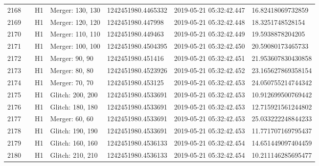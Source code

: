 \begin{longtable}{lllllll}
2168 &                                                    &       H1 &  Merger: 130, 130 &  1242451980.4465332 &  2019-05-21 05:32:42.447 &   16.82418069732859 \\
2169 &                                                    &       H1 &  Merger: 120, 120 &   1242451980.447998 &  2019-05-21 05:32:42.448 &    18.3251748528154 \\
2170 &                                                    &       H1 &  Merger: 110, 110 &   1242451980.449463 &  2019-05-21 05:32:42.449 &    19.5938878204205 \\
2171 &                                                    &       H1 &  Merger: 100, 100 &  1242451980.4504395 &  2019-05-21 05:32:42.450 &   20.59080173465733 \\
2172 &                                                    &       H1 &    Merger: 90, 90 &   1242451980.451416 &  2019-05-21 05:32:42.451 &  21.953607830430858 \\
2173 &                                                    &       H1 &    Merger: 80, 80 &  1242451980.4523926 &  2019-05-21 05:32:42.452 &  23.165627869358154 \\
2174 &                                                    &       H1 &    Merger: 70, 70 &   1242451980.453125 &  2019-05-21 05:32:42.453 &  24.050755214744342 \\
2175 &                                                    &       H1 &  Glitch: 200, 200 &  1242451980.4533691 &  2019-05-21 05:32:42.453 &  10.912699500769442 \\
2176 &                                                    &       H1 &  Glitch: 180, 180 &  1242451980.4533691 &  2019-05-21 05:32:42.453 &  12.715921561244802 \\
2177 &                                                    &       H1 &    Merger: 60, 60 &  1242451980.4533691 &  2019-05-21 05:32:42.453 &  25.033222248844233 \\
2178 &                                                    &       H1 &  Glitch: 190, 190 &  1242451980.4533691 &  2019-05-21 05:32:42.453 &  11.771707169795437 \\
2179 &                                                    &       H1 &  Glitch: 160, 160 &  1242451980.4536133 &  2019-05-21 05:32:42.454 &  14.651449097404459 \\
2180 &                                                    &       H1 &  Glitch: 210, 210 &  1242451980.4536133 &  2019-05-21 05:32:42.454 &  10.211146285695477 \\

\end{longtable}
